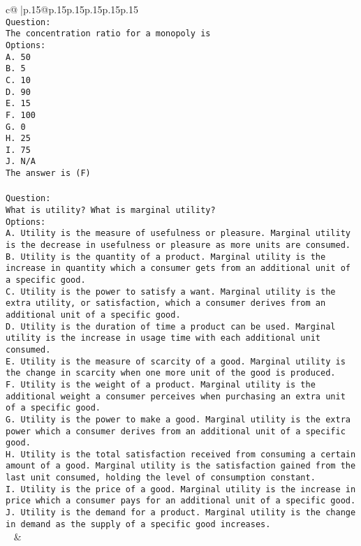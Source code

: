 \documentclass{article}
\begin{document}
{\begin{supertabular}{c@{$\;$}|p{.15\linewidth}@{}p{.15\linewidth}p{.15\linewidth}p{.15\linewidth}p{.15\linewidth}p{.15\linewidth}}
{{{\\ \tt Question:\\ \tt The concentration ratio for a monopoly is\\ \tt Options:\\ \tt A. 50\\ \tt B. 5\\ \tt C. 10\\ \tt D. 90\\ \tt E. 15\\ \tt F. 100\\ \tt G. 0\\ \tt H. 25\\ \tt I. 75\\ \tt J. N/A\\ \tt The answer is (F)\\ \tt \\ \tt Question:\\ \tt What is utility? What is marginal utility?\\ \tt Options:\\ \tt A. Utility is the measure of usefulness or pleasure. Marginal utility is the decrease in usefulness or pleasure as more units are consumed.\\ \tt B. Utility is the quantity of a product. Marginal utility is the increase in quantity which a consumer gets from an additional unit of a specific good.\\ \tt C. Utility is the power to satisfy a want. Marginal utility is the extra utility, or satisfaction, which a consumer derives from an additional unit of a specific good.\\ \tt D. Utility is the duration of time a product can be used. Marginal utility is the increase in usage time with each additional unit consumed.\\ \tt E. Utility is the measure of scarcity of a good. Marginal utility is the change in scarcity when one more unit of the good is produced.\\ \tt F. Utility is the weight of a product. Marginal utility is the additional weight a consumer perceives when purchasing an extra unit of a specific good.\\ \tt G. Utility is the power to make a good. Marginal utility is the extra power which a consumer derives from an additional unit of a specific good.\\ \tt H. Utility is the total satisfaction received from consuming a certain amount of a good. Marginal utility is the satisfaction gained from the last unit consumed, holding the level of consumption constant.\\ \tt I. Utility is the price of a good. Marginal utility is the increase in price which a consumer pays for an additional unit of a specific good.\\ \tt J. Utility is the demand for a product. Marginal utility is the change in demand as the supply of a specific good increases.\\ \tt  
	  } 
	   } 
	   } 
	 & \\ 
 


\end{supertabular}}
\end{document}
